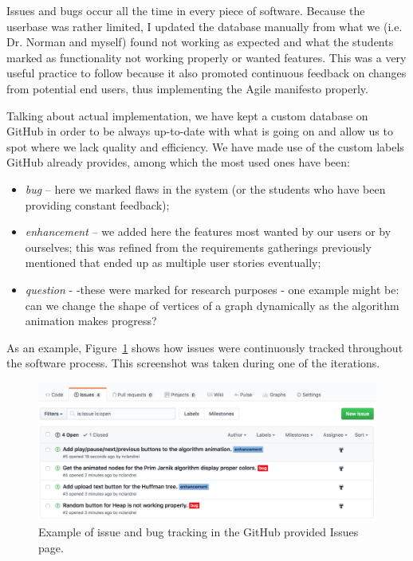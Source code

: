 \documentclass{l4proj}
\begin{document}
Issues and bugs occur all the time in every piece of software. Because the userbase was rather limited, I updated the
database manually from what we (i.e. Dr. Norman and myself) found not working as expected and what the students marked as
functionality not working properly or wanted features. This was a very useful practice to follow because it also
promoted continuous feedback on changes from potential end users, thus implementing the Agile manifesto properly.

Talking about actual implementation, we have kept a custom database on GitHub in order to be always up-to-date with what
is going on and allow us to spot where we lack quality and efficiency. We have made use of the custom labels GitHub already provides,
among which the most used ones have been:

\begin{itemize}
    \item \emph{bug} -- here we marked flaws in the system (or the students who have been providing constant feedback);
    \item \emph{enhancement} -- we added here the features most wanted by our users or by ourselves; this was refined from the
	requirements gatherings previously mentioned that ended up as multiple user stories eventually;
    \item \emph{question} - -these were marked for research purposes - one example might be: can we change the shape of vertices of a graph dynamically as the algorithm animation makes progress?
\end{itemize}

As an example, Figure~\ref{fig:issue-tracking} shows how issues were continuously tracked throughout the software process.
This screenshot was taken during one of the iterations.

\begin{figure}[!ht]
    \centering
    \includegraphics[scale=0.5]{issue-tracking}
    \caption{Example of issue and bug tracking in the GitHub provided Issues page.}
    \label{fig:issue-tracking}
\end{figure}
\end{document}
